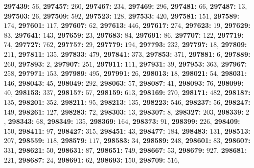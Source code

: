 \textsf{\bfseries 297439:} $56$, \textsf{\bfseries 297457:} $260$, \textsf{\bfseries 297467:} $234$, \textsf{\bfseries 297469:} $296$, \textsf{\bfseries 297481:} $66$, \textsf{\bfseries 297487:} $13$, \textsf{\bfseries 297503:} $26$, \textsf{\bfseries 297509:} $592$, \textsf{\bfseries 297523:} $128$, \textsf{\bfseries 297533:} $420$, \textsf{\bfseries 297581:} $151$, \textsf{\bfseries 297589:} $174$, \textsf{\bfseries 297601:} $117$, \textsf{\bfseries 297607:} $62$, \textsf{\bfseries 297613:} $446$, \textsf{\bfseries 297617:} $274$, \textsf{\bfseries 297623:} $19$, \textsf{\bfseries 297629:} $83$, \textsf{\bfseries 297641:} $143$, \textsf{\bfseries 297659:} $23$, \textsf{\bfseries 297683:} $84$, \textsf{\bfseries 297691:} $86$, \textsf{\bfseries 297707:} $122$, \textsf{\bfseries 297719:} $74$, \textsf{\bfseries 297727:} $762$, \textsf{\bfseries 297757:} $29$, \textsf{\bfseries 297779:} $194$, \textsf{\bfseries 297793:} $232$, \textsf{\bfseries 297797:} $18$, \textsf{\bfseries 297809:} $211$, \textsf{\bfseries 297811:} $135$, \textsf{\bfseries 297833:} $479$, \textsf{\bfseries 297841:} $373$, \textsf{\bfseries 297853:} $371$, \textsf{\bfseries 297881:} $6$, \textsf{\bfseries 297889:} $260$, \textsf{\bfseries 297893:} $2$, \textsf{\bfseries 297907:} $251$, \textsf{\bfseries 297911:} $111$, \textsf{\bfseries 297931:} $39$, \textsf{\bfseries 297953:} $363$, \textsf{\bfseries 297967:} $258$, \textsf{\bfseries 297971:} $153$, \textsf{\bfseries 297989:} $495$, \textsf{\bfseries 297991:} $26$, \textsf{\bfseries 298013:} $18$, \textsf{\bfseries 298021:} $54$, \textsf{\bfseries 298031:} $146$, \textsf{\bfseries 298043:} $45$, \textsf{\bfseries 298049:} $292$, \textsf{\bfseries 298063:} $57$, \textsf{\bfseries 298087:} $41$, \textsf{\bfseries 298093:} $76$, \textsf{\bfseries 298099:} $40$, \textsf{\bfseries 298153:} $337$, \textsf{\bfseries 298157:} $57$, \textsf{\bfseries 298159:} $613$, \textsf{\bfseries 298169:} $270$, \textsf{\bfseries 298171:} $482$, \textsf{\bfseries 298187:} $135$, \textsf{\bfseries 298201:} $352$, \textsf{\bfseries 298211:} $95$, \textsf{\bfseries 298213:} $135$, \textsf{\bfseries 298223:} $546$, \textsf{\bfseries 298237:} $56$, \textsf{\bfseries 298247:} $149$, \textsf{\bfseries 298261:} $127$, \textsf{\bfseries 298283:} $72$, \textsf{\bfseries 298303:} $13$, \textsf{\bfseries 298307:} $8$, \textsf{\bfseries 298327:} $203$, \textsf{\bfseries 298339:} $2$, \textsf{\bfseries 298343:} $68$, \textsf{\bfseries 298349:} $135$, \textsf{\bfseries 298369:} $164$, \textsf{\bfseries 298373:} $91$, \textsf{\bfseries 298399:} $226$, \textsf{\bfseries 298409:} $150$, \textsf{\bfseries 298411:} $97$, \textsf{\bfseries 298427:} $315$, \textsf{\bfseries 298451:} $43$, \textsf{\bfseries 298477:} $184$, \textsf{\bfseries 298483:} $131$, \textsf{\bfseries 298513:} $207$, \textsf{\bfseries 298559:} $118$, \textsf{\bfseries 298579:} $117$, \textsf{\bfseries 298583:} $34$, \textsf{\bfseries 298589:} $248$, \textsf{\bfseries 298601:} $83$, \textsf{\bfseries 298607:} $331$, \textsf{\bfseries 298621:} $50$, \textsf{\bfseries 298631:} $87$, \textsf{\bfseries 298651:} $749$, \textsf{\bfseries 298667:} $53$, \textsf{\bfseries 298679:} $927$, \textsf{\bfseries 298681:} $221$, \textsf{\bfseries 298687:} $24$, \textsf{\bfseries 298691:} $62$, \textsf{\bfseries 298693:} $150$, \textsf{\bfseries 298709:} $516$, 
